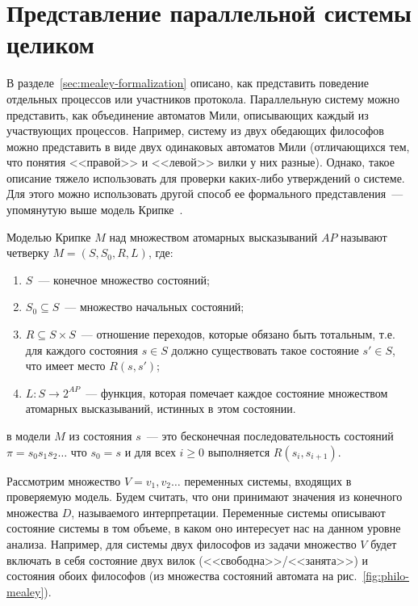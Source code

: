 \section{Представление параллельной системы целиком}
\label{sec:kripke-formalization}

В разделе~\ref{sec:mealey-formalization} описано, как представить поведение отдельных
процессов или участников протокола. Параллельную систему можно представить, как
объединение автоматов Мили, описывающих каждый из участвующих процессов. Например, систему
из двух обедающих философов можно представить в виде двух одинаковых автоматов Мили
(отличающихся тем, что понятия <<правой>> и <<левой>> вилки у них разные). Однако, такое
описание тяжело использовать для проверки каких-либо утверждений о системе. Для этого
можно использовать другой способ ее формального представления~--- упомянутую выше модель
Крипке~\cite{Clarke}.

Моделью Крипке $M$ над множеством атомарных высказываний $AP$ называют четверку $M=(S,
S_0, R, L)$, где:
\begin{enumerate}
\item $S$~--- конечное множество состояний;
\item $S_0 \subseteq S$~--- множество начальных состояний;
\item $R \subseteq S \times S$~--- отношение переходов, которые обязано быть тотальным,
  т.е. для каждого состояния $s \in S$ должно существовать такое состояние $s' \in S$, что
  имеет место $R(s, s')$;
\item $L: S \rightarrow 2^{AP}$~--- функция, которая помечает каждое состояние множеством
  атомарных высказываний, истинных в этом состоянии.
\end{enumerate}

 в модели $M$ из состояния $s$~--- это бесконечная последовательность состояний
$\pi = s_0s_1s_2 \ldots$ что $s_0 = s$ и для всех $i \geq 0$ выполняется $R(s_i,
s_{i+1})$.

Рассмотрим множество $V = {v_1, v_2 \ldots}$ переменных системы, входящих в проверяемую
модель. Будем считать, что они принимают значения из конечного множества $D$, называемого
 интерпретации. Переменные системы описывают состояние системы в том объеме,
в каком оно интересует нас на данном уровне анализа. Например, для системы двух философов
из задачи множество $V$ будет включать в себя состояние двух вилок
(<<свободна>>/<<занята>>) и состояния обоих философов (из множества состояний автомата на
рис.~\ref{fig:philo-mealey}).

